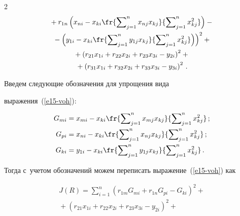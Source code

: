 \begin{multicols}{2}
\begin{multline}
  {}+r_{1n}\left( x_{ni}-x_{ki}\fr{\sum\nolimits^n_{j=1} x_{nj} x_{kj}}

  {\sum\nolimits^n_{j=1} x^2_{kj}}\right)-{}\\

 \left. {}-\left( y_{1i}-x_{ki}

  \fr{\sum\nolimits^n_{j=1} y_{1j} x_{kj}}

  {\sum\nolimits^n_{j=1} x^2_{kj}}\right)\right)^2+{}\\

  {}+

 \left( r_{21}x_{1i}+r_{22} x_{2i}+r_{23}x_{3i}-

y_{2i}\right)^2 +{}\\

  {}+\left( r_{31}x_{1i}+r_{32} x_{2i}+r_{33}x_{3i}-y_{3i}\right)^2\,.

  \label{e15-voh}

  \end{multline}

  

  Введем следующие обозначения для упрощения вида  

выражения~(\ref{e15-voh}):

  \begin{align*}

  G_{mi}&=x_{{m}i}-x_{ki} \fr{\sum\nolimits^n_{j=1} x_{mj} x_{kj}} 

{\sum\nolimits^n_{j=1} x^2_{kj}}\,;\\

  G_{pi}&=x_{ni}- x_{ki} \fr{\sum\nolimits^n_{j=1} x_{nj} x_{kj}} 

{\sum\nolimits^n_{j=1} x^2_{kj}}\,;\\

  G_{ki}&=y_{1i}- x_{ki} \fr{\sum\nolimits^n_{j=1} y_{1j} x_{kj}} 

{\sum\nolimits^n_{j=1} x^2_{kj}}\,.

  \end{align*}

Тогда с~учетом обозначений можем переписать выражение~(\ref{e15-voh}) как

\begin{multline}

J(R)=\sum\limits^n_{i=1}\left( r_{1{m}} G_{mi}+r_{1{n}}G_{pi} 

-G_{ki}\right)^2+{}\\

{}+ \left( r_{21}x_{1i} +r_{22}x_{2i} +r_{23}x_{3i}-y_{2i}\right)^2+{}\\


\end{multline}
\end{multicols}
